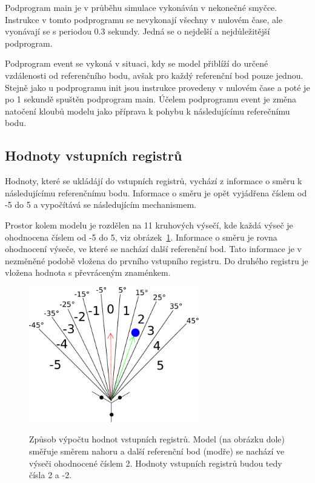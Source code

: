 Podprogram main je v průběhu simulace vykonáván v nekonečné smyčce.
Instrukce v tomto podprogramu se nevykonají všechny v nulovém čase, ale vyonávají se s periodou 0.3 sekundy.
Jedná se o nejdelší a nejdůležitější podprogram.

Podprogram event se vykoná v situaci, kdy se model přiblíží do určené vzdálenosti od referenčního bodu, avšak pro každý referenční bod pouze jednou.
Stejně jako u podprogramu init jsou instrukce provedeny v nulovém čase a poté je po 1 sekundě spuštěn podprogram main.
Účelem podprogramu event je změna natočení kloubů modelu jako příprava k pohybu k následujícímu referečnímu bodu.

\subsection{Hodnoty vstupních registrů}
Hodnoty, které se ukládájí do vstupních registrů, vychází z informace o směru k následujícímu referenčnímu bodu.
Informace o směru je opět vyjádřena číslem od -5 do 5 a vypočítává se následujícím mechanismem.

Prostor kolem modelu je rozdělen na 11 kruhových výsečí, kde každá výseč je ohodnocena číslem od -5 do 5, viz obrázek~\ref{fig:kruhove_vysece}.
Informace o směru je rovna ohodnocení výseče, ve které se nachází další referenční bod.
Tato informace je v nezměněné podobě vložena do prvního vstupního registru.
Do druhého registru je vložena hodnota s převráceným znaménkem.

\begin{figure}[h]
    \centering
    {\includegraphics[width=20em]{obrazky/reference_direction_angles.pdf}}
    \caption{
    Způsob výpočtu hodnot vstupních registrů.
    Model (na obrázku dole) směřuje směrem nahoru a další referenční bod (modře) se nachází ve výseči ohodnocené číslem 2.
    Hodnoty vstupních registrů budou tedy čísla 2 a -2.
    }
    \label{fig:kruhove_vysece}
\end{figure}

